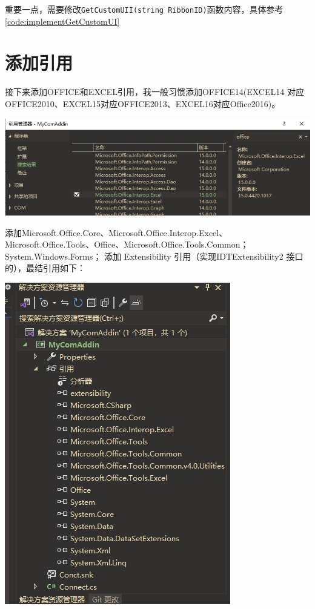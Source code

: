 \documentclass[math,code]{amznotes}
\begin{document}
	重要一点，需要修改\texttt{GetCustomUII(string RibbonID)}函数内容，具体参考\ref{code:implementGetCustomUI}%
	
	\section{添加引用}
	接下来添加OFFICE和EXCEL引用，我一般习惯添加OFFICE14(EXCEL14 对应OFFICE2010、EXCEL15对应OFFICE2013、EXCEL16对应Office2016)。
	
	\includegraphics[width=0.9\linewidth]{pic/reference_excel}
	
	添加Microsoft.Office.Core、Microsoft.Office.Interop.Excel、Microsoft.Office.Tools、Office、Microsoft.Office.Tools.Common；System.Windows.Forms；	
	添加 Extensibility 引用（实现IDTExtensibility2 接口的），最结引用如下：
	
	\includegraphics[]{pic/extensibility}
	
\end{document}
